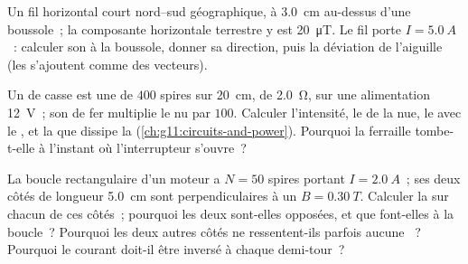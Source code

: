 \begin{exercise}[$\star\star\star$]\label{exo:g11:magnetic-fields:12}
Un fil horizontal court nord--sud géographique, à \qty{3.0}{cm}
au-dessus d'une boussole~; la composante horizontale terrestre y est
\qty{20}{\micro T}. Le fil porte $I = \qty{5.0}{A}$~: calculer son
 à la boussole, donner sa
direction, puis la déviation de l'aiguille (les
 s'ajoutent comme des
vecteurs).
\end{exercise}

\begin{exercise}[$\star\star\star$]\label{exo:g11:magnetic-fields:13}
Un  de casse est une
 de $400$ spires sur \qty{20}{cm}, de
 \qty{2.0}{\ohm}, sur une
alimentation \qty{12}{V}~; son  de fer multiplie le
 nu par $100$. Calculer
l'intensité, le  de la
 nue, le
 avec le , et la
 que dissipe la
 (\cref{ch:g11:circuits-and-power}).
Pourquoi la ferraille tombe-t-elle à l'instant où l'interrupteur
s'ouvre~?
\end{exercise}

\begin{exercise}[$\star\star\star$]\label{exo:g11:magnetic-fields:14}
La boucle rectangulaire d'un moteur a $N = 50$ spires portant
$I = \qty{2.0}{A}$~; ses deux côtés de longueur \qty{5.0}{cm} sont
perpendiculaires à un 
$B = \qty{0.30}{T}$. Calculer la  sur
chacun de ces côtés~; pourquoi les deux
 sont-elles opposées, et que
font-elles à la boucle~? Pourquoi les deux autres côtés ne ressentent-ils
parfois aucune ~? Pourquoi le courant
doit-il être inversé à chaque demi-tour~?
\end{exercise}


